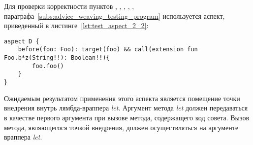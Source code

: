 Для проверки корректности пунктов \quotes{\ref{list:lambda_wrapper_check}},
\quotes{\ref{list:buffer_method_check}},
\quotes{\ref{list:buffer_method_call_check}},
\quotes{\ref{list:pointcut_call_check}},
\quotes{\ref{list:target_use_check}}, параграфа~\ref{subs:advice_weaving_testing_program}  используется аспект, приведенный в листинге~\ref{lst:test_aspect_2_2}:
\begin{lstlisting}[style={java}, label={lst:test_aspect_2_2},
  caption={Пример тестового аспекта}]
aspect D {
    before(foo: Foo): target(foo) && call(extension fun Foo.b*z(String!!): Boolean!!){
        foo.foo()
    }
}
\end{lstlisting}
Ожидаемым результатом применения этого аспекта является помещение точки внедрения внутрь лямбда-враппера \textit{let}.
Аргумент метода \textit{let} должен передаваться в качестве первого аргумента при вызове метода, содержащего код совета.
Вызов метода, являющегося точкой внедрения, должен осуществляться на аргументе враппера \textit{let}.

